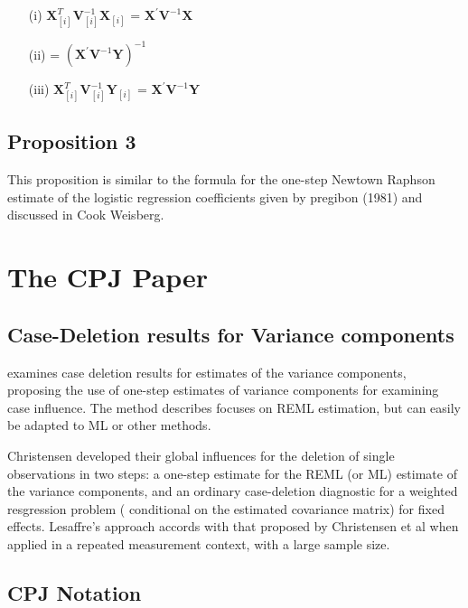 \documentclass[Main.tex]{subfiles}
\begin{document}
\begin{itemize}
	\item[(i)] $ \boldsymbol{X}_{[i]}^{T}\boldsymbol{V}^{-1}_{[i]}\boldsymbol{X}_{[i]}$ = $\boldsymbol{X}^{\prime}\boldsymbol{V}^{-1}\boldsymbol{X}$
	\item[(ii)] = $(\boldsymbol{X}^{\prime}\boldsymbol{V}^{-1}\boldsymbol{Y})^{-1}$
	\item[(iii)] $ \boldsymbol{X}_{[i]}^{T}\boldsymbol{V}^{-1}_{[i]}\boldsymbol{Y}_{[i]}$ = $\boldsymbol{X}^{\prime}\boldsymbol{V}^{-1}\boldsymbol{Y}$
\end{itemize}
\subsection{Proposition 3}
This proposition is similar to the formula for the one-step Newtown Raphson estimate of the logistic regression coefficients given by pregibon (1981)
and discussed in Cook Weisberg.

\section{The CPJ Paper}%

\subsection{Case-Deletion results for Variance components}
\citet{Christensen}examines case deletion results for estimates of the variance components, proposing the use of one-step estimates of variance components for examining case influence. The method describes focuses on REML estimation, but can easily be adapted to ML or other methods.

Christensen developed their global influences for the deletion of single observations in two steps: a one-step estimate for the REML (or ML) estimate of the variance components, and an ordinary case-deletion diagnostic for a weighted resgression problem ( conditional on the estimated covariance matrix) for fixed effects. Lesaffre's approach accords with that proposed by Christensen et al when applied in a repeated measurement context, with a large
sample size.


\subsection{CPJ Notation}
\end{document}
